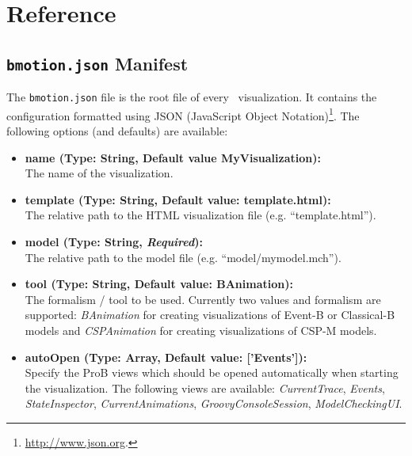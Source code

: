 \section{Reference}
\label{reference}

\subsection{\texttt{bmotion.json} Manifest}
\label{sec:manifest}

The \texttt{bmotion.json} file is the root file of every \bms\ visualization.
It contains the configuration formatted using JSON (JavaScript Object Notation)\footnote{\url{http://www.json.org}.}.
The following options (and defaults) are available:

\begin{itemize}
	\item[] \textbf{name (Type: String, Default value MyVisualization):}\\The name of the visualization. 
	\item[] \textbf{template (Type: String, Default value: template.html):}\\The relative path to the HTML visualization file  (e.g. ``template.html'').
	\item[] \textbf{model (Type: String, \textit{Required}):}\\The relative path to the model file (e.g. ``model/mymodel.mch'').
	\item[] \textbf{tool (Type: String, Default value: BAnimation):}\\The formalism / tool to be used. Currently two values and formalism are supported: \textit{BAnimation} for creating visualizations of Event-B or Classical-B models and \textit{CSPAnimation} for creating visualizations of CSP-M models.
	\item[] \textbf{autoOpen (Type: Array, Default value: ['Events']):}\\Specify the ProB views which should be opened automatically when starting the visualization. 
The following views are available: \textit{CurrentTrace}, \textit{Events}, \textit{StateInspector}, \textit{CurrentAnimations}, \textit{GroovyConsoleSession}, \textit{ModelCheckingUI}.
\end{itemize}
